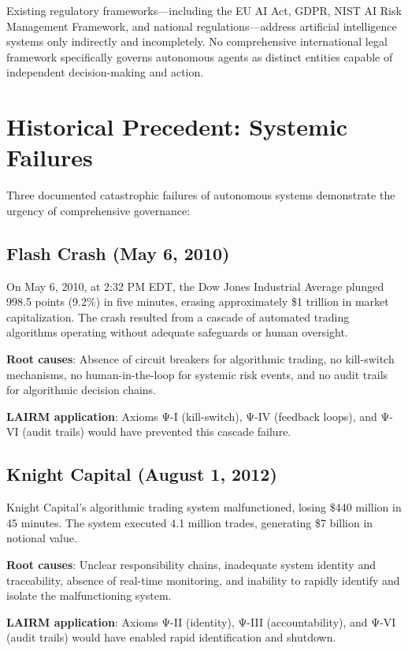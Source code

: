 \documentclass[12pt,a4paper,twoside,openright]{book}
\begin{document}
Existing regulatory frameworks—including the EU AI Act, GDPR, NIST AI Risk Management Framework, and national regulations—address artificial intelligence systems only indirectly and incompletely. No comprehensive international legal framework specifically governs autonomous agents as distinct entities capable of independent decision-making and action.

\section{Historical Precedent: Systemic Failures}

Three documented catastrophic failures of autonomous systems demonstrate the urgency of comprehensive governance:

\subsection{Flash Crash (May 6, 2010)}

On May 6, 2010, at 2:32 PM EDT, the Dow Jones Industrial Average plunged 998.5 points (9.2\%) in five minutes, erasing approximately \$1 trillion in market capitalization. The crash resulted from a cascade of automated trading algorithms operating without adequate safeguards or human oversight.

\textbf{Root causes}: Absence of circuit breakers for algorithmic trading, no kill-switch mechanisms, no human-in-the-loop for systemic risk events, and no audit trails for algorithmic decision chains.

\textbf{LAIRM application}: Axioms Ψ-I (kill-switch), Ψ-IV (feedback loops), and Ψ-VI (audit trails) would have prevented this cascade failure.

\subsection{Knight Capital (August 1, 2012)}

Knight Capital's algorithmic trading system malfunctioned, losing \$440 million in 45 minutes. The system executed 4.1 million trades, generating \$7 billion in notional value.

\textbf{Root causes}: Unclear responsibility chains, inadequate system identity and traceability, absence of real-time monitoring, and inability to rapidly identify and isolate the malfunctioning system.

\textbf{LAIRM application}: Axioms Ψ-II (identity), Ψ-III (accountability), and Ψ-VI (audit trails) would have enabled rapid identification and shutdown.
\end{document}
